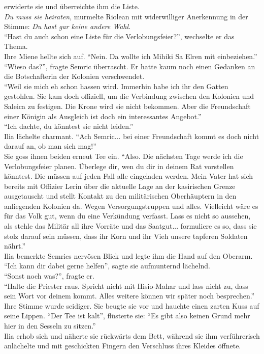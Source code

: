 erwiderte sie und überreichte ihm die Liste.\\
\textit{Du muss sie heiraten}, murmelte Riolean mit widerwilliger Anerkennung in der Stimme: 
\textit{Du hast gar keine andere Wahl.}\\
``Hast du auch schon eine Liste für die Verlobungsfeier?'', wechselte er das Thema.\\
Ihre Miene hellte sich auf. ``Nein. Da wollte ich Mihiki Sa Elren mit einbeziehen.''\\
``Wieso das?'', fragte Semric überrascht. Er hatte kaum noch einen Gedanken an die Botschafterin 
der Kolonien verschwendet.\\
``Weil sie mich eh schon hassen wird. Immerhin habe ich ihr den Gatten gestohlen. Sie kam doch 
offiziell, um die Verbindung zwischen den Kolonien und Saleica zu festigen. Die Krone wird sie 
nicht bekommen. Aber die Freundschaft einer Königin als Ausgleich ist doch ein interessantes 
Angebot.''\\
``Ich dachte, du könntest sie nicht leiden.''\\
Ilia lächelte charmant. ``Ach Semric... bei einer Freundschaft kommt es doch nicht darauf an, ob 
man sich mag!''\\
Sie goss ihnen beiden erneut Tee ein. ``Also. Die nächsten Tage werde ich die Verlobungsfeier 
planen. Überlege dir, wen du dir in deinem Rat vorstellen könntest. Die müssen auf jeden Fall alle 
eingeladen werden. Mein Vater hat sich bereits mit Offizier Lerin über die aktuelle Lage an der 
kasirischen Grenze ausgetauscht und stellt Kontakt zu den militärischen Oberhäuptern in den 
anliegenden Kolonien da. Wegen Versorgungstruppen und alles. Vielleicht wäre es für das Volk gut, 
wenn du eine Verkündung verfasst. Lass es nicht so aussehen, als stehle das Militär all ihre 
Vorräte und das Saatgut... formuliere es so, dass sie stolz darauf sein müssen, dass ihr Korn und 
ihr Vieh unsere tapferen Soldaten nährt.''\\
Ilia bemerkte Semrics nervösen Blick und legte ihm die Hand auf den Oberarm. ``Ich kann dir dabei 
gerne helfen'', sagte sie aufmunternd lächelnd.\\
``Sonst noch was?'', fragte er.\\
``Halte die Priester raus. Spricht nicht mit Hisio-Mahar und lass nicht zu, dass sein Wort vor 
deinem kommt. Alles weitere können wir später noch besprechen.'' Ihre Stimme wurde seidiger. Sie 
beugte sie vor und hauchte einen zarten Kuss auf seine Lippen. ``Der Tee ist kalt'', flüsterte sie: 
``Es gibt also keinen Grund mehr hier in den Sesseln zu sitzen.''\\
Ilia erhob sich und näherte sie rückwärts dem Bett, während sie ihm verführerisch anlächelte und 
mit geschickten Fingern den Verschluss ihres Kleides öffnete.\\

